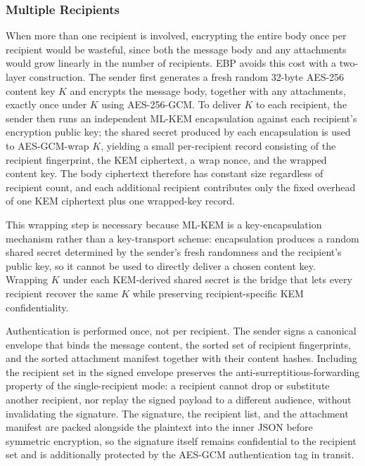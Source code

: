\documentclass[11pt,a4paper]{article}
\begin{document}
\subsubsection{Multiple Recipients}

When more than one recipient is involved, encrypting the entire body once per recipient would be wasteful, since both the message body and any attachments would grow linearly in the number of recipients. EBP avoids this cost with a two-layer construction. The sender first generates a fresh random 32-byte AES-256 content key $K$ and encrypts the message body, together with any attachments, exactly once under $K$ using AES-256-GCM. To deliver $K$ to each recipient, the sender then runs an independent ML-KEM encapsulation against each recipient's encryption public key; the shared secret produced by each encapsulation is used to AES-GCM-wrap $K$, yielding a small per-recipient record consisting of the recipient fingerprint, the KEM ciphertext, a wrap nonce, and the wrapped content key. The body ciphertext therefore has constant size regardless of recipient count, and each additional recipient contributes only the fixed overhead of one KEM ciphertext plus one wrapped-key record.

This wrapping step is necessary because ML-KEM is a key-encapsulation mechanism rather than a key-transport scheme: encapsulation produces a random shared secret determined by the sender's fresh randomness and the recipient's public key, so it cannot be used to directly deliver a chosen content key. Wrapping $K$ under each KEM-derived shared secret is the bridge that lets every recipient recover the same $K$ while preserving recipient-specific KEM confidentiality.

Authentication is performed once, not per recipient. The sender signs a canonical envelope that binds the message content, the sorted set of recipient fingerprints, and the sorted attachment manifest together with their content hashes. Including the recipient set in the signed envelope preserves the anti-surreptitious-forwarding property of the single-recipient mode: a recipient cannot drop or substitute another recipient, nor replay the signed payload to a different audience, without invalidating the signature. The signature, the recipient list, and the attachment manifest are packed alongside the plaintext into the inner JSON before symmetric encryption, so the signature itself remains confidential to the recipient set and is additionally protected by the AES-GCM authentication tag in transit.
\end{document}
